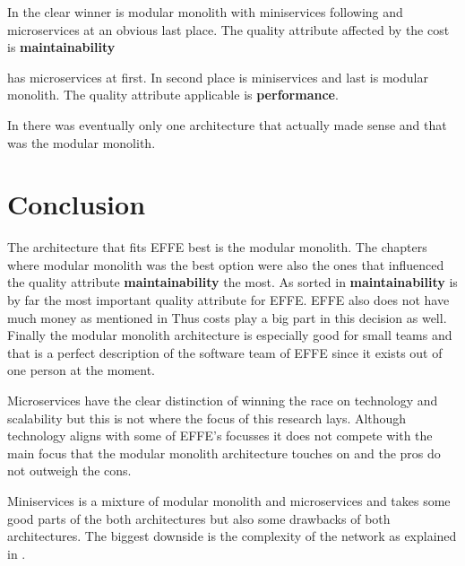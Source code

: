 In  the clear winner is modular monolith with miniservices following and microservices at an obvious last place. The quality attribute affected by the cost is \textbf{maintainability}

 has microservices at first. In second place is miniservices and last is modular monolith. The quality attribute applicable is \textbf{performance}.

In  there was eventually only one architecture that actually made sense and that was the modular monolith.

\section{Conclusion}

The architecture that fits EFFE best is the modular monolith. The chapters where modular monolith was the best option were also the ones that influenced the quality attribute \textbf{maintainability} the most. As sorted in  \textbf{maintainability} is by far the most important quality attribute for EFFE. EFFE also does not have much money as mentioned in  Thus costs play a big part in this decision as well. Finally the modular monolith architecture is especially good for small teams and that is a perfect description of the software team of EFFE since it exists out of one person at the moment.

Microservices have the clear distinction of winning the race on technology and scalability but this is not where the focus of this research lays. Although technology aligns with some of EFFE's focusses it does not compete with the main focus that the modular monolith architecture touches on and the pros do not outweigh the cons.

Miniservices is a mixture of modular monolith and microservices and takes some good parts of the both architectures but also some drawbacks of both architectures. The biggest downside is the complexity of the network as explained in .
